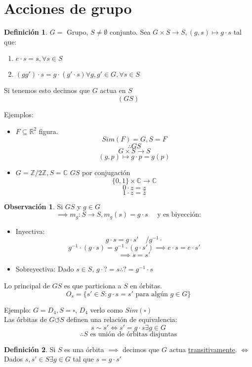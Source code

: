 \documentclass[11pt]{book}
\theoremstyle{definition}
\newtheorem{defn}{Definición}[section]
\newtheorem{obs}{Observación}[section]
\begin{document}
\section{Acciones de grupo}
\begin{defn}
	$G=$ Grupo, $S\neq\emptyset$ conjunto. Sea $G\times S\rightarrow S,(g,s)\mapsto g\cdot s$ tal que:
	\begin{enumerate}[label=(\alph*)]
		\item $e\cdot s= s,\forall s\in S$

		\item $(gg')\cdot s=g\cdot(g'\cdot s)\forall g,g'\in G,\forall s\in S$
	\end{enumerate}
	Si tenemos esto decimos que $G$ actua en $S$
	\[(G S)\]
\end{defn}
Ejemplos:
\begin{itemize}
	\item $F\subseteq\mathbb{R}^2$ figura.\\
	\[Sim(F)=G, S=F\]
	\[\therefore G S\]
	\[G\times S\rightarrow S\]
	\[(g,p)\mapsto g\cdot p=g(p)\]

	\item $G=\mathbb{Z}/2\mathbb{Z}, S=\mathbb{C}$
	$G S$ por conjugación
	\[\{0,1\}\times\mathbb{C}\rightarrow\mathbb{C}\]
	\[0\cdot z= z\]
	\[1\cdot z=\bar{z}\]
	
\end{itemize}
\begin{obs}
	Si $G S$ y $g\in G$
	\[\implies m_g:S\rightarrow S, m_g(s)=g\cdot s\quad\textrm{ y es biyección:}\]
	\begin{itemize}
		\item Inyectiva: 
		\[g\cdot s=g\cdot s'\quad /g^{-1}\cdot\]
		\[g^{-1}\cdot (g\cdot s)=g^{-1}\cdot (g\cdot s')\implies e\cdot s=e\cdot s'\]
		\[\implies s=s'\]

		\item Sobreyectiva: Dado $s\in S$, $g\cdot ?=s\therefore ?=g^{-1}\cdot s$
	\end{itemize}
	
	Lo principal de $G S$ es que particiona a $S$ en órbitas.
	\[O_s=\{s'\in S:g\cdot s=s'\textrm{ para algún }g\in G\}\]
\end{obs}
Ejemplo: $G=D_4, S=\square$, $D_4$ verlo como $Sim(\square)$\\
Las órbitas de $G\circlearrowleft S$ definen una relación de equivalencia:
\[s\sim s'\iff s'=g\cdot s\exists g\in G\]
\[\therefore S\textrm{ es unión de órbitas disjuntas}\]
\begin{defn}
	Si $S$ es una órbita $\implies$ decimos que $G$ actua \underline{transitivamente}. $\iff$ Dados $s,s'\in S\exists g\in G$ tal que $s=g\cdot s'$
\end{defn}
\end{document}
